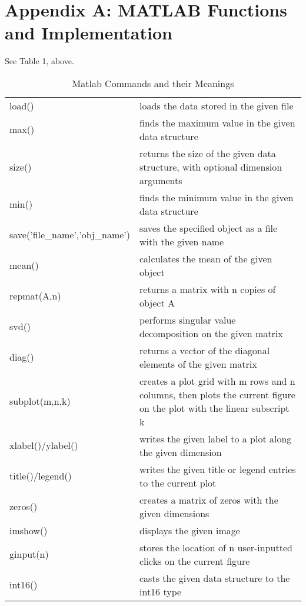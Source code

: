 \documentclass[a4paper,10 pt]{article}
\begin{document}
\section{Appendix A: MATLAB Functions and Implementation}
See Table 1, above.
\begin{table}[]
\begin{tabular}{ll}
load() & loads the data stored in the given file \\
max() & finds the maximum value in the given data structure \\
size() & returns the size of the given data structure, with optional dimension arguments \\
min() & finds the minimum value in the given data structure \\
save('file\_name','obj\_name') & saves the specified object as a file with the given name \\
mean() & calculates the mean of the given object \\
repmat(A,n) & returns a matrix with n copies of object A \\
svd() & performs singular value decomposition on the given matrix \\
diag() & returns a vector of the diagonal elements of the given matrix \\
subplot(m,n,k) & creates a plot grid with m rows and n columns, then plots the current figure on the plot with the linear subscript k \\
xlabel()/ylabel() & writes the given label to a plot along the given dimension \\
title()/legend() & writes the given title or legend entries to the current plot \\
zeros() & creates a matrix of zeros with the given dimensions \\
imshow() & displays the given image \\
ginput(n) & stores the location of n user-inputted clicks on the current figure \\
int16() & casts the given data structure to the int16 type
\end{tabular}
\caption{Matlab Commands and their Meanings}
\end{table}
\end{document}

